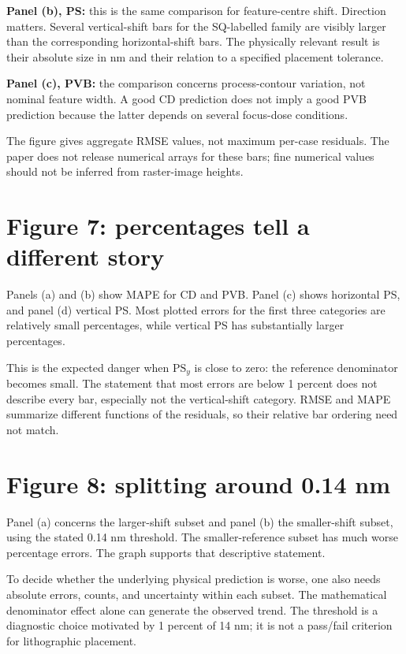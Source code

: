 \textbf{Panel (b), PS:} this is the same comparison for feature-centre
shift. Direction matters. Several vertical-shift bars for the SQ-labelled
family are visibly larger than the corresponding horizontal-shift bars.
The physically relevant result is their absolute size in nm and their
relation to a specified placement tolerance.

\textbf{Panel (c), PVB:} the comparison concerns process-contour
variation, not nominal feature width. A good CD prediction does not
imply a good PVB prediction because the latter depends on several
focus-dose conditions.

The figure gives aggregate RMSE values, not maximum per-case residuals.
The paper does not release numerical arrays for these bars; fine numerical
values should not be inferred from raster-image heights.

\section{Figure 7: percentages tell a different story}
Panels (a) and (b) show MAPE for CD and PVB. Panel (c) shows horizontal
PS, and panel (d) vertical PS. Most plotted errors for the first three
categories are relatively small percentages, while vertical PS has
substantially larger percentages.

This is the expected danger when $\mathrm{PS}_y$ is close to zero:
the reference denominator becomes small. The statement that most errors
are below 1 percent does not describe every bar, especially not the
vertical-shift category.
RMSE and MAPE summarize different functions of the residuals, so
their relative bar ordering need not match.

\section{Figure 8: splitting around 0.14 nm}
Panel (a) concerns the larger-shift subset and panel (b) the smaller-shift
subset, using the stated 0.14 nm threshold.
The smaller-reference subset has much worse percentage errors.
The graph supports that descriptive statement.

To decide whether the underlying physical prediction is worse, one also
needs absolute errors, counts, and uncertainty within each subset.
The mathematical denominator effect alone can generate the observed trend.
The threshold is a diagnostic choice motivated by 1 percent of 14 nm;
it is not a pass/fail criterion for lithographic placement.

